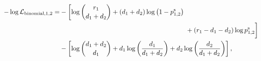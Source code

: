 \documentclass{article}
\begin{document}
{
\newcommand{\firstline}{\log\binom{r_1}{d_1+d_2} + (d_1+d_2) \log \left(1-p_{1,2}^\text{s}\right)}
\newcommand{\secondline}{+ (r_1-d_1-d_2) \log p_{1,2}^\text{s}}
\begin{align}
\begin{aligned}
-\log \mathcal{L}_{\text{binomial},1,2} =&-\left[\firstline\vphantom{\secondline}\right. \\
&\phantom{-\left[\firstline\vphantom{\secondline}\right.}\left.\vphantom{\firstline}\secondline\right] \\
&-\left[\log\binom{d_1+d_2}{d_1} + d_1 \log \left(\frac{d_1}{d_1+d_2}\right) + d_2 \log \left(\frac{d_2}{d_1+d_2}\right)\right],
\end{aligned}
\label{eq:test}
\end{align}
}
\end{document}
